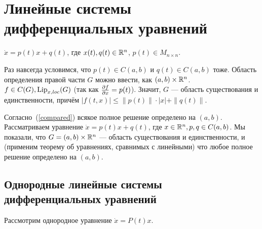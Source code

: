 \documentclass[a4paper]{report}
\begin{document}
    \section{Линейные системы дифференциальных уравнений}
    $\dot{x} = p(t)x + q(t)$, где $x(t), q(t) \in \mathbb{R}^n$, $p(t) \in M_{n \times n}$.

    Раз навсегда условимся, что $p(t)\in C(a, b)$ и $q(t) \in C(a, b)$ тоже.
    Область определения правой части $G$ можно ввести, как $(a, b)\times \mathbb{R}^n$. $f \in C(G), \operatorname{Lip}_{x,loc}(G)$ (так как $\frac{\partial f}{\partial x} = p(t)$).
    Значит, $G$ --- область существования и единственности, причём $|f(t, x)| \le \|p(t)\| \cdot |x| + \|q(t)\|$.

    Согласно~(\ref{compared}) всякое полное решение определено на $(a, b)$.
    Рассматриваем уравнение $\dot{x} = p(t)x + q(t)$, где $x \in \mathbb{R}^n, p, q \in C(a, b)$.
    Мы показали, что $G = (a, b)\times \mathbb{R}^n$ --- область существования и единственности, и (применим теорему об уравнениях, сравнимых с линейными) что любое полное решение определено на $(a, b)$.


    \subsection{Однородные линейные системы дифференциальных уравнений}
    Рассмотрим однородное уравнение $\dot{x} = P(t)x$.
\end{document}
